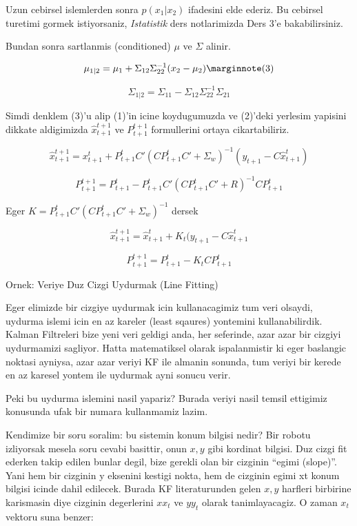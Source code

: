 \documentclass[12pt,fleqn]{article}\usepackage{../common}
\begin{document}
Uzun cebirsel islemlerden sonra $p(x_1|x_2)$ ifadesini elde ederiz. Bu
cebirsel turetimi gormek istiyorsaniz, {\em Istatistik} ders notlarimizda
Ders 3'e bakabilirsiniz.

Bundan sonra sartlanmis (conditioned) $\mu$ ve $\Sigma$ alinir.

\[ 
\mu_{1|2} = \mu_1 + \Sigma_{12}\Sigma_{22}^{-1}(x_2 - \mu_2) 
\mlabel{3}
\]

\[ \Sigma_{1|2} = \Sigma_{11}- \Sigma_{12}\Sigma_{22}^{-1}\Sigma_{21} \]

Simdi denklem (3)'u alip (1)'in icine koydugumuzda ve (2)'deki
yerlesim yapisini dikkate aldigimizda $\hat{x}_{t+1}^{t+1}$ ve
$P_{t+1}^{t+1}$ formullerini ortaya cikartabiliriz.

\[ \hat{x}_{t+1}^{t+1} =  x_{t+1}^{t} +  P_{t+1}^{t}C'(CP_{t+1}^{t}C' + \Sigma_w)^{-1}
(y_{t+1}- C\hat{x}_{t+1}^t)
\]

\[ P_{t+1}^{t+1} = P_{t+1}^{t} - P_{t+1}^{t} C'(CP_{t+1}^{t} C'+R)^{-1}CP_{t+1}^{t} 
\]

Eger $K = P_{t+1}^{t}C'(CP_{t+1}^{t}C' + \Sigma_w)^{-1}$ dersek

\[  \hat{x}_{t+1}^{t+1}  =  \hat{x}_{t+1}^{t} + K_t (y_{t+1} - C \hat{x}_{t+1}^{t}  \]

\[  P_{t+1}^{t+1} =  P_{t+1}^{t} - K_tC P_{t+1}^{t} \]

Ornek: Veriye Duz Cizgi Uydurmak (Line Fitting)

Eger elimizde bir cizgiye uydurmak icin kullanacagimiz tum veri olsaydi,
uydurma islemi icin en az kareler (least sqaures) yontemini
kullanabilirdik.  Kalman Filtreleri bize yeni veri geldigi anda, her
seferinde, azar azar bir cizgiyi uydurmamizi sagliyor. Hatta matematiksel
olarak ispalanmistir ki eger baslangic noktasi ayniysa, azar azar veriyi KF
ile almanin sonunda, tum veriyi bir kerede en az karesel yontem ile
uydurmak ayni sonucu verir.

Peki bu uydurma islemini nasil yapariz? Burada veriyi nasil temsil ettigimiz
konusunda ufak bir numara kullanmamiz lazim.

Kendimize bir soru soralim: bu sistemin konum bilgisi nedir? Bir robotu
izliyorsak mesela soru cevabi basittir, onun $x, y$ gibi kordinat
bilgisi. Duz cizgi fit ederken takip edilen bunlar degil, bize gerekli olan
bir cizginin ``egimi (slope)''. Yani hem bir cizginin y eksenini kestigi
nokta, hem de cizginin egimi xt konum bilgisi icinde dahil edilecek. Burada
KF literaturunden gelen $x, y$ harfleri birbirine karismasin diye cizginin
degerlerini $xx_t$ ve $yy_t$ olarak tanimlayacagiz. O zaman $x_t$ vektoru suna
benzer:
\end{document}

